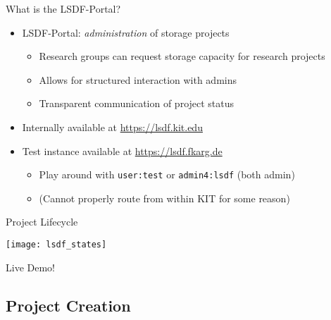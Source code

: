 \begin{frame}[c,fragile]{What is the LSDF-Portal?}
    \large
    \begin{itemize}[<+(1)->]
        \item LSDF-Portal: {\em administration} of storage projects
            \begin{itemize}[<+(1)->]
                \item Research groups can request storage capacity for research projects
                \item Allows for structured interaction with admins
                \item Transparent communication of project status
            \end{itemize}
        \item Internally available at \url{https://lsdf.kit.edu}
        \item Test instance available at \url{https://lsdf.fkarg.de}
            \begin{itemize}[<+(1)->]
                \item Play around with \verb!user:test! or \verb!admin4:lsdf! (both admin)
                \item (Cannot properly route from within KIT for some reason)
            \end{itemize}
    \end{itemize}
\end{frame}

\begin{frame}[c]{Project Lifecycle}
    \begin{center}
    \texttt{[image: lsdf\_states]}
    \end{center}
\end{frame}



\addtocounter{framenumber}{1}
\begin{frame}[standout]
    \Huge
    Live Demo!
\end{frame}

\subsection{Project Creation}

